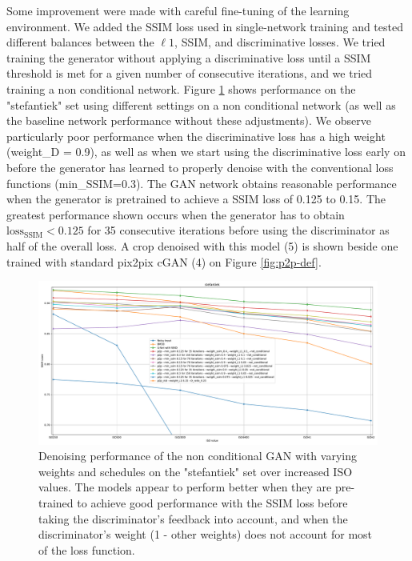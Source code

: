 Some improvement were made with careful fine-tuning of the learning environment. We added the \ac{SSIM} loss used in single-network training and tested different balances between the $\ell 1$, \ac{SSIM}, and discriminative losses. We tried training the generator without applying a discriminative loss until a SSIM threshold is met for a given number of consecutive iterations, and we tried training a non conditional network. Figure \ref{fig:p2p-comp-1} shows performance on the "stefantiek" set using different settings on a non conditional network (as well as the baseline network performance without these adjustments). We observe particularly poor performance when the discriminative loss has a high weight (weight\_D = 0.9), as well as when we start using the discriminative loss early on before the generator has learned to properly denoise with the conventional loss functions (min\_SSIM=0.3). The GAN network obtains reasonable performance when the generator is pretrained to achieve a \ac{SSIM} loss of 0.125 to 0.15. The greatest performance shown occurs when the generator has to obtain $\text{loss}_\text{SSIM} < 0.125$ for 35 consecutive iterations before using the discriminator as half of the overall loss. A crop denoised with this model (5) is shown beside one trained with standard pix2pix \ac{cGAN} (4) on Figure \ref{fig:p2p-def}.

\begin{figure}[!htbp]
\centering
\includegraphics[width=1\linewidth]{gfx/graphs/p2p-comp-1.pdf}
\caption[Denoising performance of \acsp{GAN} on the "stefantiek" set]{Denoising performance of the non conditional GAN with varying weights and schedules on the "stefantiek" set over increased ISO values. The models appear to perform better when they are pre-trained to achieve good performance with the \acs{SSIM} loss before taking the discriminator's feedback into account, and when the discriminator's weight (1 - other weights) does not account for most of the loss function.}
\label{fig:p2p-comp-1}
\end{figure}

